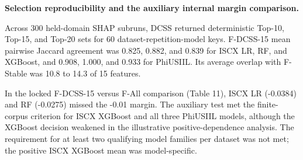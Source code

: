 \documentclass[
  10pt,
]{article}
\begin{document}
\textbf{Selection reproducibility and the auxiliary internal margin
comparison.}

Across 300 held-domain SHAP subruns, DCSS returned deterministic Top-10,
Top-15, and Top-20 sets for 60 dataset-repetition-model keys. F-DCSS-15
mean pairwise Jaccard agreement was 0.825, 0.882, and 0.839 for ISCX LR,
RF, and XGBoost, and 0.908, 1.000, and 0.933 for PhiUSIIL. Its average
overlap with F-Stable was 10.8 to 14.3 of 15 features.

In the locked F-DCSS-15 versus F-All comparison (Table 11), ISCX LR
(-0.0384) and RF (-0.0275) missed the -0.01 margin. The auxiliary test
met the finite-corpus criterion for ISCX XGBoost and all three PhiUSIIL
models, although the XGBoost decision weakened in the illustrative
positive-dependence analysis. The requirement for at least two
qualifying model families per dataset was not met; the positive ISCX
XGBoost mean was model-specific.
\end{document}
